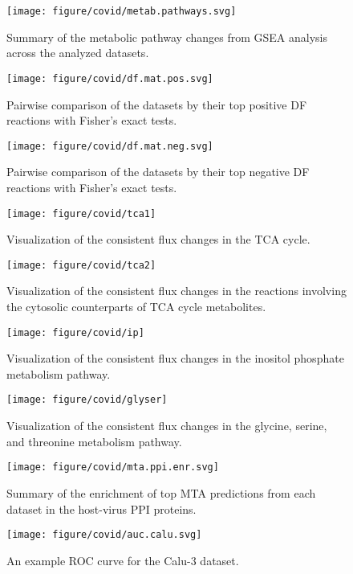 \documentclass[12pt,twoside,openany,\mydriver]{thesis}  %
\begin{document}
\begin{figure}
\texttt{[image: figure/covid/metab.pathways.svg]} \caption{Summary of the metabolic pathway changes from GSEA analysis across the analyzed datasets.}\label{fig:covid-gsea-metab}
\end{figure}
\begin{figure}
\texttt{[image: figure/covid/df.mat.pos.svg]} \caption{Pairwise comparison of the datasets by their top positive DF reactions with Fisher's exact tests.}\label{fig:covid-df-pos-mat}
\end{figure}
\begin{figure}
\texttt{[image: figure/covid/df.mat.neg.svg]} \caption{Pairwise comparison of the datasets by their top negative DF reactions with Fisher's exact tests.}\label{fig:covid-df-neg-mat}
\end{figure}
\begin{figure}
\texttt{[image: figure/covid/tca1]} \caption{Visualization of the consistent flux changes in the TCA cycle.}\label{fig:covid-flux-tca1}
\end{figure}
\begin{figure}
\texttt{[image: figure/covid/tca2]} \caption{Visualization of the consistent flux changes in the reactions involving the cytosolic counterparts of TCA cycle metabolites.}\label{fig:covid-flux-tca2}
\end{figure}
\begin{figure}
\texttt{[image: figure/covid/ip]} \caption{Visualization of the consistent flux changes in the inositol phosphate metabolism pathway.}\label{fig:covid-flux-inositol}
\end{figure}
\begin{figure}
\texttt{[image: figure/covid/glyser]} \caption{Visualization of the consistent flux changes in the glycine, serine, and threonine metabolism pathway.}\label{fig:covid-flux-glycine}
\end{figure}
\begin{figure}
\texttt{[image: figure/covid/mta.ppi.enr.svg]} \caption{Summary of the enrichment of top MTA predictions from each dataset in the host-virus PPI proteins.}\label{fig:covid-mta-ppi-enr}
\end{figure}
\begin{figure}
\texttt{[image: figure/covid/auc.calu.svg]} \caption{An example ROC curve for the Calu-3 dataset.}\label{fig:covid-mta-roc-calu3}
\end{figure}
\end{document}
